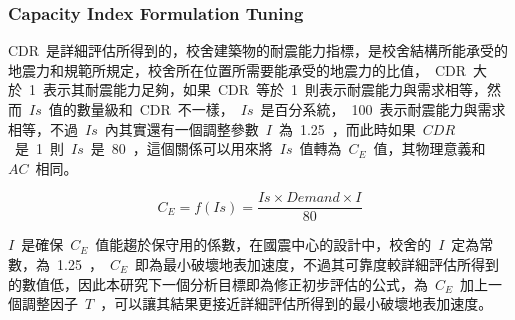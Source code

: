 
\subsubsection{Capacity Index Formulation Tuning}

CDR~是詳細評估所得到的，校舍建築物的耐震能力指標，是校舍結構所能承受的地震力和規範所規定，校舍所在位置所需要能承受的地震力的比值，~CDR~大於~1~表示其耐震能力足夠，如果~CDR~等於~1~則表示耐震能力與需求相等，然而~$Is$~值的數量級和~CDR~不一樣，~$Is$~是百分系統，~100~表示耐震能力與需求相等，不過~$Is$~內其實還有一個調整參數~$I$~為~1.25~，而此時如果~$CDR$~是~1~則~$Is$~是~80~，這個關係可以用來將~$Is$~值轉為~$C_E$~值，其物理意義和~$AC$~相同。


\begin{equation} C_E = f(Is) = \dfrac{Is \times Demand \times I}{80}  \label{eq:CE}\end{equation}

$I$~是確保~$C_E$~值能趨於保守用的係數，在國震中心的設計中，校舍的~$I$~定為常數，為~1.25~，~$C_E$~即為最小破壞地表加速度，不過其可靠度較詳細評估所得到的數值低，因此本研究下一個分析目標即為修正初步評估的公式，為~$C_E$~加上一個調整因子~$T$~，可以讓其結果更接近詳細評估所得到的最小破壞地表加速度。

